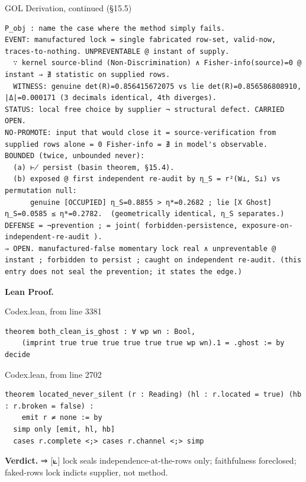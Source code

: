 \documentclass[10pt,twocolumn]{article}
\begin{document}
\begin{golbox}{GOL Derivation, continued (§15.5)}
\begin{lstlisting}[style=golv]
P_obj : name the case where the method simply fails.
EVENT: manufactured lock = single fabricated row-set, valid-now, traces-to-nothing. UNPREVENTABLE @ instant of supply.
  ∵ kernel source-blind (Non-Discrimination) ∧ Fisher-info(source)=0 @ instant ⇒ ∄ statistic on supplied rows.
  WITNESS: genuine det(R)=0.856415672075 vs lie det(R)=0.856586808910, |Δ|=0.000171 (3 decimals identical, 4th diverges).
STATUS: local free choice by supplier ¬ structural defect. CARRIED OPEN.
NO-PROMOTE: input that would close it = source-verification from supplied rows alone = 0 Fisher-info = ∄ in model's observable.
BOUNDED (twice, unbounded never):
  (a) ⊬ persist (basin theorem, §15.4).
  (b) exposed @ first independent re-audit by η_S = r²(W⟂, S⟂) vs permutation null:
      genuine [OCCUPIED] η_S=0.8855 > η*=0.2682 ; lie [X Ghost] η_S=0.0585 ≤ η*=0.2782.  (geometrically identical, η_S separates.)
DEFENSE = ¬prevention ; = joint( forbidden-persistence, exposure-on-independent-re-audit ).
⇒ OPEN. manufactured-false momentary lock real ∧ unpreventable @ instant ; forbidden to persist ; caught on independent re-audit. (this entry does not seal the prevention; it states the edge.)
\end{lstlisting}
\end{golbox}

\textbf{Lean Proof.}

\begin{leanexcerpt}{Codex.lean, from line 3381}
\begin{lstlisting}[style=leanx,firstnumber=3381]
theorem both_clean_is_ghost : ∀ wp wn : Bool,
    (imprint true true true true true true wp wn).1 = .ghost := by decide
\end{lstlisting}
\end{leanexcerpt}

\begin{leanexcerpt}{Codex.lean, from line 2702}
\begin{lstlisting}[style=leanx,firstnumber=2702]
theorem located_never_silent (r : Reading) (hl : r.located = true) (hb : r.broken = false) :
    emit r ≠ none := by
  simp only [emit, hl, hb]
  cases r.complete <;> cases r.channel <;> simp
\end{lstlisting}
\end{leanexcerpt}

\textbf{Verdict.} ⇒ {[}⟀{]} lock seals independence-at-the-rows only;
faithfulness foreclosed; faked-rows lock indicts supplier, not method.
\end{document}
